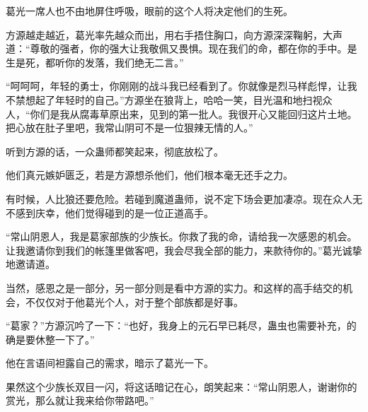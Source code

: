 \begin{this_body}
葛光一席人也不由地屏住呼吸，眼前的这个人将决定他们的生死。

方源越走越近，葛光率先越众而出，用右手捂住胸口，向方源深深鞠躬，大声道：“尊敬的强者，你的强大让我敬佩又畏惧。现在我们的命，都在你的手中。是生是死，都听你的发落，我们绝无二言。”

“呵呵呵，年轻的勇士，你刚刚的战斗我已经看到了。你就像是烈马样彪悍，让我不禁想起了年轻时的自己。”方源坐在狼背上，哈哈一笑，目光温和地扫视众人，“你们是我从腐毒草原出来，见到的第一批人。我很开心又能回归这片土地。把心放在肚子里吧，我常山阴可不是一位狠辣无情的人。”

听到方源的话，一众蛊师都笑起来，彻底放松了。

他们真元嫉妒匮乏，若是方源想杀他们，他们根本毫无还手之力。

有时候，人比狼还要危险。若碰到魔道蛊师，说不定下场会更加凄凉。现在众人无不感到庆幸，他们觉得碰到的是一位正道高手。

“常山阴恩人，我是葛家部族的少族长。你救了我的命，请给我一次感恩的机会。让我邀请你到我们的帐篷里做客吧，我会尽我全部的能力，来款待你的。”葛光诚挚地邀请道。

当然，感恩之是一部分，另一部分则是看中方源的实力。和这样的高手结交的机会，不仅仅对于他葛光个人，对于整个部族都是好事。

“葛家？”方源沉吟了一下：“也好，我身上的元石早已耗尽，蛊虫也需要补充，的确是要休整一下了。”

他在言语间袒露自己的需求，暗示了葛光一下。

果然这个少族长双目一闪，将这话暗记在心，朗笑起来：“常山阴恩人，谢谢你的赏光，那么就让我来给你带路吧。”

\end{this_body}

